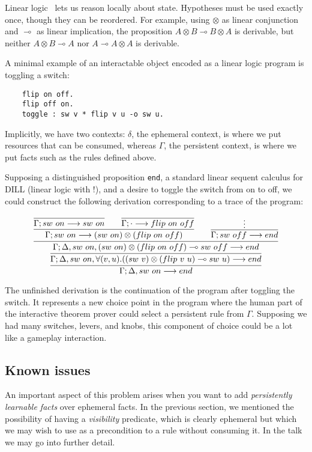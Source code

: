 \newcommand{\lolli}{\multimap}

Linear logic~\cite{Girard87} lets us reason locally about state. Hypotheses
must be used exactly once, though they can be reordered. For example, using
$\otimes$ as linear conjunction and $\lolli$ as linear implication, the
proposition $A \otimes B \lolli B \otimes A$ is derivable, but neither $A
\otimes B \lolli A$ nor $A \lolli A \otimes A$ is derivable.

A minimal example of an interactable object encoded as a linear logic
program is toggling a switch:

\begin{verbatim}
    flip on off.
    flip off on.
    toggle : sw v * flip v u -o sw u.
\end{verbatim}

\noindent
Implicitly, we have two contexts: $\delta$, the ephemeral context, is where
we put resources that can be consumed, whereas $\Gamma$, the persistent
context, is where we put facts such as the rules defined above.

Supposing a distinguished proposition \verb|end|, a standard linear sequent
calculus for DILL (linear logic with $!$), and a desire to toggle the
switch from on to off, we could construct the following derivation
corresponding to a trace of the program:

{\small
\[
\infer
{
  \Gamma; \Delta, sw\ on \longrightarrow end
}
{
  \infer
  {
    \Gamma; \Delta, sw\ on, \forall(v,u).((sw\ v)\otimes (flip\ v\
    u)\multimap sw\ u)
    \longrightarrow end
  }
  {
  \infer
    {
    \Gamma; \Delta, sw\ on, (sw\ on)\otimes (flip\ on\ off)\multimap sw\
    off
    \longrightarrow end
    }
    {
        \infer{
          \Gamma; sw\ on \longrightarrow (sw\ on)\otimes(flip\ on\ off)
          }
          {
            \infer
            {\Gamma; sw\ on \longrightarrow sw\ on}
            {}
            \qquad
            \infer
            {\Gamma; \cdot \longrightarrow flip\ on\ off}
            {}
          }
        \qquad
        \infer{
          \Gamma; sw\ off \longrightarrow end
          }
          {\vdots
          }
    }
  }
}
\]
}

\noindent
The unfinished derivation is the continuation of the program after toggling
the switch. It represents a new choice point in the program where the human
part of the interactive theorem prover could select a persistent rule from
$\Gamma$.  Supposing we had many switches, levers, and knobs, this
component of choice could be a lot like a gameplay interaction.



 \subsection{Known issues}
 
 An important aspect of this problem arises when you want to add {\em
 persistently learnable facts} over ephemeral facts. In the previous
 section, we mentioned the possibility of having a {\em visibility}
 predicate, which is clearly ephemeral but which we may wish to use as a
 precondition to a rule without consuming it. In the talk we may go into
 further detail.
